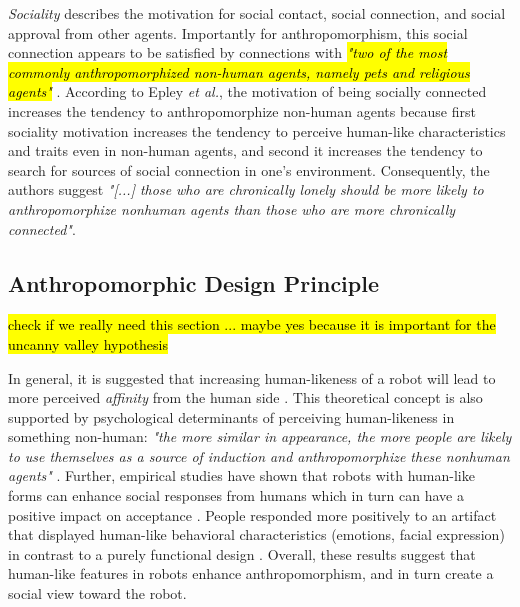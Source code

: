 \documentclass{frontiersSCNS} %
\begin{document}
\textit{Sociality} describes the motivation for social contact, social
connection, and social approval from other agents. Importantly for
anthropomorphism, this social connection appears to be satisfied by connections
with \hl{ \textit{"two of the most commonly anthropomorphized non-human agents,
namely pets and religious agents"}} \cite{epley_seeing_2007}. According to Epley
\textit{et al.}, the motivation of being socially connected increases the
tendency to anthropomorphize non-human agents because first sociality motivation
increases the tendency to perceive human-like characteristics and traits even in
non-human agents, and second it increases the tendency to search for sources of
social connection in one's environment. Consequently, the authors suggest
\textit{"[...] those who are chronically lonely should be more likely to
anthropomorphize nonhuman agents than those who are more chronically
connected"}. 



\subsection*{Anthropomorphic Design Principle}
\label{sec:anthropomorphic-design}

\hl{check if we really need this section ... maybe yes because it is important for the uncanny valley hypothesis}

In general, it is suggested that increasing human-likeness of a robot	 will
lead to more perceived \textit{affinity} from the human side
\cite{mori_uncanny_1970}. This theoretical concept is also supported by
psychological determinants of perceiving human-likeness in something non-human:
\textit{"the more similar in appearance, the more people are likely to use
themselves as a source of induction and anthropomorphize these nonhuman agents"}
\cite{epley_seeing_2007}. Further, empirical studies have shown that robots with
human-like forms can enhance social responses from humans which in turn can have
a positive impact on acceptance
\cite{venkatesh_theoretical_2000,duffy_anthropomorphism_2003,goetz_cooperation_2002}.
People responded more positively to an artifact that displayed human-like
behavioral characteristics (emotions, facial expression) in contrast to a purely
functional design
\cite{eyssel_anthropomorphic_2010,krach_can_2008,reeves_media_1996,riek_how_2009}.
Overall, these results suggest that human-like features in robots enhance
anthropomorphism, and in turn create a social view toward the robot.
\end{document}
